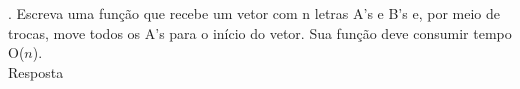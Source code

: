 . Escreva uma função que recebe um vetor com n letras A’s e B’s e, por meio de trocas, move todos os A’s para o início do vetor. Sua função deve consumir tempo O($n$).\\[6pt]
Resposta\\